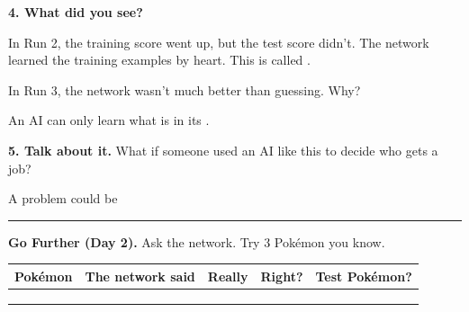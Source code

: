 \documentclass[11pt]{article}
\begin{document}
\newpage


{\large\textbf{4. What did you see?}}

\vspace{0.5em}
In Run 2, the training score went up, but the test score didn't. The network learned the training examples by heart. This is called .

\vspace{0.9em}
In Run 3, the network wasn't much better than guessing. Why? 

\vspace{0.9em}
An AI can only learn what is in its .

\vspace{1.1em}
{\large\textbf{5. Talk about it.}} What if someone used an AI like this to decide who gets a job?

\vspace{0.6em}
A problem could be 

\vspace{0.9em}
\blank{6.9in}

\vspace{1.2em}
\hrule
\vspace{0.8em}
{\large\textbf{Go Further (Day 2).}} Ask the network. Try 3 Pokémon you know.

\vspace{0.3em}
\begin{tabular}{|R{1.5in}|R{1.5in}|R{1.5in}|c|c|}
\hline
\textbf{Pokémon} & \textbf{The network said} & \textbf{Really} & \textbf{Right?} & \textbf{Test Pokémon?} \\ \hline
{} & & & & \\[0.4em] \hline
 & & & & \\[0.4em] \hline
 & & & & \\[0.4em] \hline
\end{tabular}

\vspace{1.1em}
\end{document}
